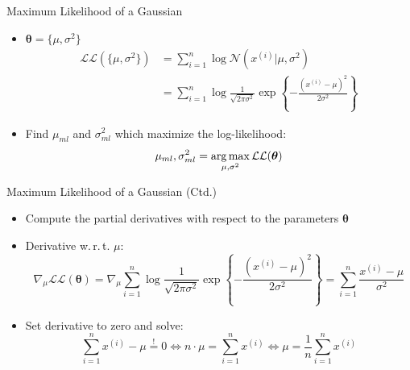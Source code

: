 \begin{frame}{Maximum Likelihood of a Gaussian}{}
	\begin{itemize}
		\item $\bm{\theta} = \{ \mu, \sigma^2 \}$
		\begin{align}
			\mathcal{L}\mathcal{L}(\{ \mu, \sigma^2 \})
				&= \sum_{i=1}^n \log \mathcal{N}(x^{(i)} \vert \mu, \sigma^2) \\
				&= \sum_{i=1}^n \log \frac{1}{\sqrt{2 \pi \sigma^2}} \exp\left\{ -\frac{(x^{(i)} - \mu)^2}{2 \sigma^2} \right\}
		\end{align}
		\item Find $\mu_{ml}$ and $\sigma_{ml}^2$ which maximize the log-likelihood:
		\begin{equation*}
			\mu_{ml}, \sigma_{ml}^2 = \operatorname*{arg\,max}_{\mu, \sigma^2} \mathcal{L}\mathcal{L}(\bm{\theta})
		\end{equation*}
	\end{itemize}
\end{frame}


\begin{frame}{Maximum Likelihood of a Gaussian (Ctd.)}{}
	\begin{itemize}
		\item Compute the partial derivatives with respect to the parameters $\bm{\theta}$
		\item Derivative w.\,r.\,t. $\mu$:
		\begin{equation*}
			\nabla_{\mu}\mathcal{L}\mathcal{L}(\bm{\theta})
				= \nabla_{\mu} \sum_{i=1}^n \log \frac{1}{\sqrt{2 \pi \sigma^2}} \exp\left\{ -\frac{(x^{(i)} - \mu)^2}{2 \sigma^2} \right\}
				= \sum_{i=1}^n \frac{x^{(i)} - \mu}{\sigma^2}
		\end{equation*}
		\item Set derivative to zero and solve:
		\begin{equation*}
			\sum_{i=1}^n x^{(i)} - \mu \overset{!}{=} 0
				\Leftrightarrow n \cdot \mu = \sum_{i=1}^n x^{(i)}
				\Leftrightarrow \mu = \frac{1}{n} \sum_{i=1}^n x^{(i)}
 		\end{equation*}
	\end{itemize}
\end{frame}



